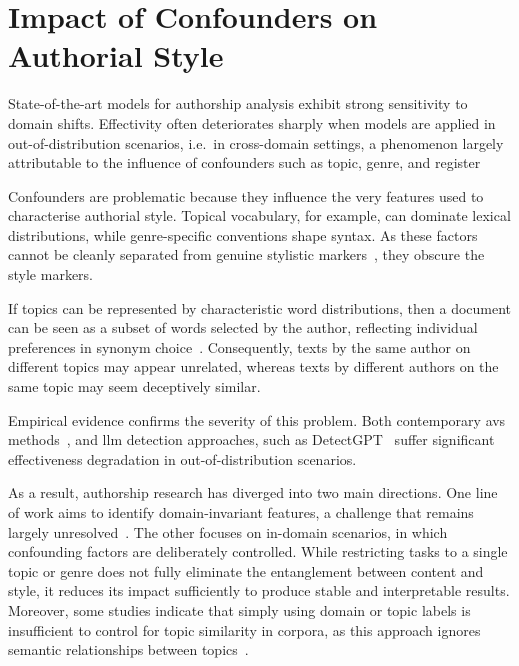 \section{Impact of Confounders on Authorial Style}
\label{sec:contextual_factors}

State-of-the-art models for authorship analysis exhibit strong sensitivity to domain shifts. 
Effectivity often deteriorates sharply when models are applied in out-of-distribution scenarios, i.e.\ in cross-domain settings, a phenomenon largely attributable to the influence of confounders such as topic, genre, and register~\citep{Sundararajan_style_18,bischoff_importance_2020}

Confounders are problematic because they influence the very features used to characterise authorial style. 
Topical vocabulary, for example, can dominate lexical distributions, while genre-specific conventions shape syntax. 
As these factors cannot be cleanly separated from genuine stylistic markers~\citep{bischoff_importance_2020}, they obscure the style markers.

If topics can be represented by characteristic word distributions, then a document can be seen as a subset of words selected by the author, reflecting individual preferences in synonym choice~\citep{altakrori_topic_2021}. 
Consequently, texts by the same author on different topics may appear unrelated, whereas texts by different authors on the same topic may seem deceptively similar.

Empirical evidence confirms the severity of this problem.
Both contemporary \acp{av} methods~\citep{Thomas_cross_topic_24}, and \ac{llm} detection approaches, such as DetectGPT~\citep{mitchell_detectgpt_2023,Wu_ODD_challenges_2025} suffer significant effectiveness degradation in out-of-distribution scenarios.

As a result, authorship research has diverged into two main directions. 
One line of work aims to identify domain-invariant features, a challenge that remains largely unresolved~\citep{bischoff_importance_2020}. 
The other focuses on in-domain scenarios, in which confounding factors are deliberately controlled. %
While restricting tasks to a single topic or genre does not fully eliminate the entanglement between content and style, it reduces its impact sufficiently to produce stable and interpretable results. 
Moreover, some studies indicate that simply using domain or topic labels is insufficient to control for topic similarity in corpora, as this approach ignores semantic relationships between topics~\citep{sawatphol_cross_topic_av_24}.
